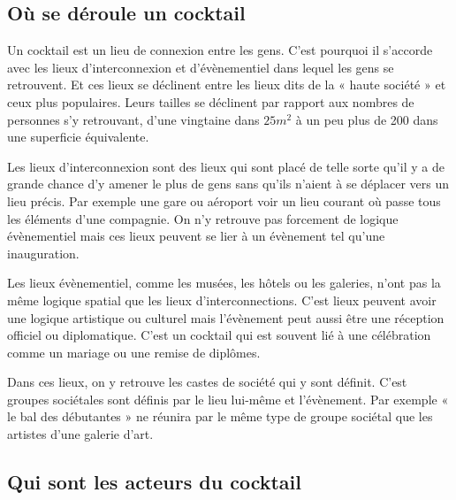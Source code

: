 \subsection{Où se déroule un cocktail}


Un cocktail est un lieu de connexion entre les gens. C’est pourquoi il s’accorde avec les lieux d’interconnexion et d’évènementiel dans lequel les gens se retrouvent. Et ces lieux se déclinent entre les lieux dits de la « haute société » et ceux plus populaires. Leurs tailles se déclinent par rapport aux nombres de personnes s’y retrouvant, d’une vingtaine dans $25m^2$ à un peu plus de 200 dans une superficie équivalente.

Les lieux d’interconnexion sont des lieux qui sont placé de telle sorte qu’il y a de grande chance d’y amener le plus de gens sans qu’ils n’aient à se déplacer vers un lieu précis. Par exemple une gare ou aéroport voir un lieu courant où passe tous les éléments d’une compagnie. On n’y retrouve pas forcement de logique évènementiel mais ces lieux peuvent se lier à un évènement tel qu’une inauguration.

Les lieux évènementiel, comme les musées, les hôtels ou les galeries, n’ont pas la même logique spatial que les lieux d’interconnections.  C’est lieux peuvent avoir une logique artistique ou culturel mais l’évènement peut aussi être une réception officiel ou diplomatique. C’est un cocktail qui est souvent lié à une célébration comme un mariage ou une remise de diplômes.

Dans ces lieux, on y retrouve les castes de société qui y sont définit. C’est groupes sociétales sont définis par le lieu lui-même et l’évènement. Par exemple « le bal des débutantes » ne réunira par le même type de groupe sociétal que les artistes d’une galerie d’art.


\subsection{Qui sont les acteurs du cocktail}


